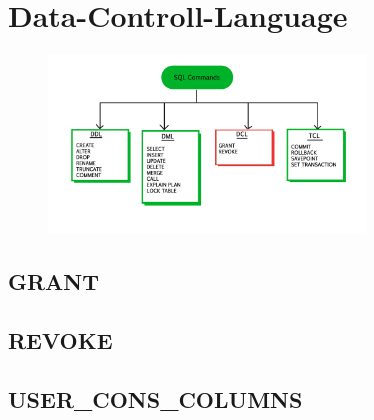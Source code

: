 \section[DCL]{Data-Controll-Language}
\label{sec:dcl}

\begin{figure}[h]
  \centering
  \includegraphics[width=0.75\textwidth]{img//sql-commands-dcl.jpg}
  \label{img:dcl}
\end{figure}

\subsection{GRANT}
\label{sec:dcl.grant}

\subsection{REVOKE}
\label{sec:dcl.revoke}

\subsection{USER\_CONS\_COLUMNS}
\label{sec:dcl.user_cons_columns}
